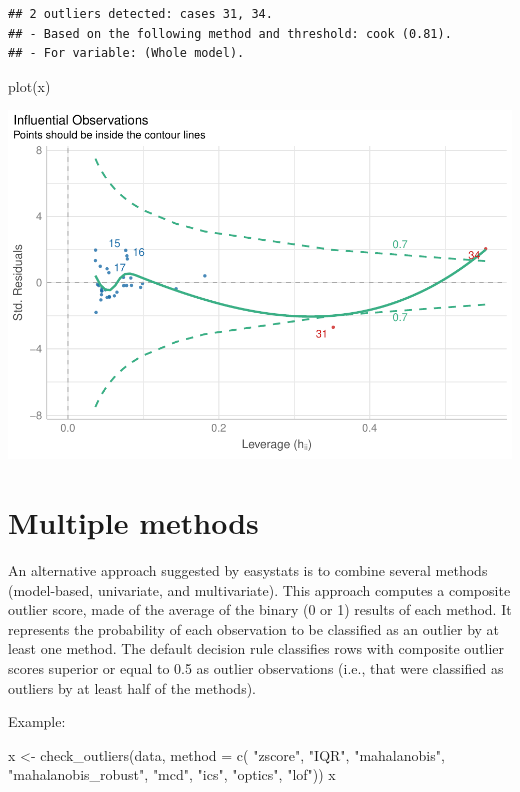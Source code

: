 \documentclass[
]{article}
\newenvironment{Shaded}{\begin{snugshade}}{\end{snugshade}}
\newcommand{\AttributeTok}[1]{\textcolor[rgb]{0.77,0.63,0.00}{#1}}
\newcommand{\FunctionTok}[1]{\textcolor[rgb]{0.00,0.00,0.00}{#1}}
\newcommand{\NormalTok}[1]{#1}
\newcommand{\OtherTok}[1]{\textcolor[rgb]{0.56,0.35,0.01}{#1}}
\newcommand{\StringTok}[1]{\textcolor[rgb]{0.31,0.60,0.02}{#1}}
\begin{document}
\begin{verbatim}
## 2 outliers detected: cases 31, 34.
## - Based on the following method and threshold: cook (0.81).
## - For variable: (Whole model).
\end{verbatim}

\begin{Shaded}
\begin{Highlighting}[]
\FunctionTok{plot}\NormalTok{(x)}
\end{Highlighting}
\end{Shaded}

\includegraphics{paper_files/figure-latex/model-based outliers-1.pdf}

\hypertarget{multiple-methods}{%
\section{Multiple methods}\label{multiple-methods}}

An alternative approach suggested by easystats is to combine several
methods (model-based, univariate, and multivariate). This approach
computes a composite outlier score, made of the average of the binary (0
or 1) results of each method. It represents the probability of each
observation to be classified as an outlier by at least one method. The
default decision rule classifies rows with composite outlier scores
superior or equal to 0.5 as outlier observations (i.e., that were
classified as outliers by at least half of the methods).

Example:

\begin{Shaded}
\begin{Highlighting}[]
\NormalTok{x }\OtherTok{\textless{}{-}} \FunctionTok{check\_outliers}\NormalTok{(data, }\AttributeTok{method =} \FunctionTok{c}\NormalTok{(}
  \StringTok{"zscore"}\NormalTok{, }\StringTok{"IQR"}\NormalTok{, }\StringTok{"mahalanobis"}\NormalTok{, }\StringTok{"mahalanobis\_robust"}\NormalTok{, }\StringTok{"mcd"}\NormalTok{, }\StringTok{"ics"}\NormalTok{, }\StringTok{"optics"}\NormalTok{, }\StringTok{"lof"}\NormalTok{))}
\NormalTok{x}
\end{Highlighting}
\end{Shaded}
\end{document}
